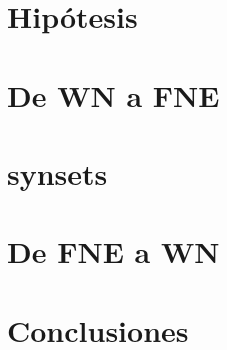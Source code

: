 \documentclass[a4paper,9pt]{extarticle}
\begin{document}
\begin{multicols*}{2}
\section{Hipótesis}

\section{De WN a FNE}

\section{synsets}

\section{De FNE a WN}

\section{Conclusiones }

\end{multicols*}
\end{document}
